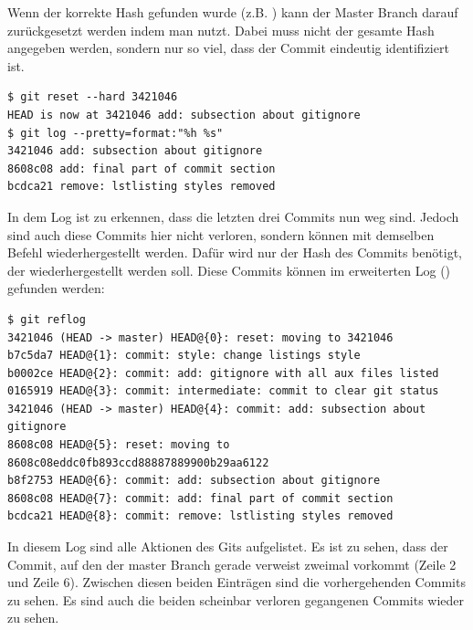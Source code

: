 Wenn der korrekte Hash gefunden wurde (z.B. )  kann der Master Branch darauf zurückgesetzt werden indem man  nutzt. Dabei muss nicht der gesamte Hash angegeben werden, sondern nur so viel, dass der Commit eindeutig identifiziert ist.
\begin{lstlisting}
$ git reset --hard 3421046
HEAD is now at 3421046 add: subsection about gitignore
$ git log --pretty=format:"%h %s" 
3421046 add: subsection about gitignore
8608c08 add: final part of commit section
bcdca21 remove: lstlisting styles removed
\end{lstlisting}
In dem Log ist zu erkennen, dass die letzten drei Commits nun weg sind. Jedoch sind auch diese Commits hier nicht verloren, sondern können mit demselben Befehl wiederhergestellt werden. Dafür wird nur der Hash des Commits benötigt, der wiederhergestellt werden soll. Diese Commits können im erweiterten Log () gefunden werden:
\begin{lstlisting}
$ git reflog
3421046 (HEAD -> master) HEAD@{0}: reset: moving to 3421046
b7c5da7 HEAD@{1}: commit: style: change listings style
b0002ce HEAD@{2}: commit: add: gitignore with all aux files listed
0165919 HEAD@{3}: commit: intermediate: commit to clear git status
3421046 (HEAD -> master) HEAD@{4}: commit: add: subsection about gitignore
8608c08 HEAD@{5}: reset: moving to 8608c08eddc0fb893ccd88887889900b29aa6122
b8f2753 HEAD@{6}: commit: add: subsection about gitignore
8608c08 HEAD@{7}: commit: add: final part of commit section
bcdca21 HEAD@{8}: commit: remove: lstlisting styles removed
\end{lstlisting}
In diesem Log sind alle Aktionen des Gits aufgelistet. Es ist zu sehen, dass der Commit, auf den der master Branch gerade verweist zweimal vorkommt (Zeile 2 und Zeile 6). Zwischen diesen beiden Einträgen sind die vorhergehenden Commits zu sehen. Es sind auch die beiden scheinbar verloren gegangenen Commits wieder zu sehen.






